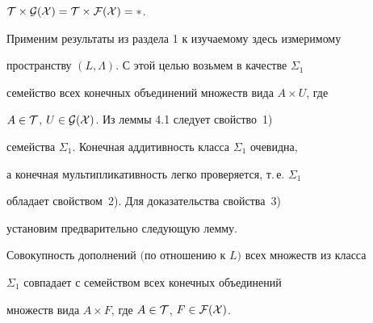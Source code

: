  


\begin{lems} 


$\cal T\times\cal G(X)=\cal T\times\cal F(X)=\Lambda$. 


\end{lems} 


 


Применим результаты из раздела 1 к изучаемому здесь измеримому 


пространству $(L,\Lambda)$. С этой целью возьмем в качестве $\Sigma_1$ 


семейство всех конечных объединений множеств вида $A\times U$, где 


$A\in\cal T$, $U\in\cal G(X)$. Из леммы 4.1 следует свойство~1) 


семейства $\Sigma_1$. Конечная аддитивность класса $\Sigma_1$ очевидна, 


а конечная мультипликативность легко проверяется, т.\,е. $\Sigma_1$ 


обладает свойством~2). Для доказательства свойства~3) 


установим предварительно следующую лемму. 


 


\begin{lems} 


Совокупность дополнений $($по отношению к $L)$ всех множеств из класса 


$\Sigma_1$ совпадает с семейством всех конечных объединений 


множеств вида $A\times F$, где $A\in\cal T$, $F\in\cal F(X)$. 


\end{lems} 


 


